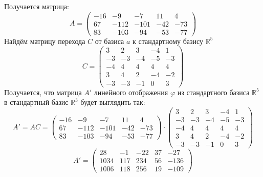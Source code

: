 \documentclass[a4paper]{article}
\newcommand{\mat}[1]{\begin{pmatrix} #1 \end{pmatrix}}
\renewcommand{\phi}{\varphi}
\newcommand{\RR}{\mathbb{R}}
\begin{document}
\begin{enumerate}
\begin{enumerate}
        Получается матрица:
        $$A = \begin{pmatrix}
            -16 & -9 & -7 & 11 & 4 \\
            67 & -112 & -101 & -42 & -73  \\
            83 & -103 & -94 & -53 & -77 
            \end{pmatrix}$$
        Найдём матрицу перехода $C$ от базиса $a$ к стандартному базису $\RR^5$
        $$C = \mat{3 & 2 & 3 & -4 & 1 \\
        -3 & -3 & -4 & -5 & -3 \\
        -4 & 4 & 4 & 4 & 4 \\
        3 & 4 & 2 & -4 & -2 \\
        -3 & -3 & -1 & 0 & 3}$$
        Получается, что матрица $A'$ линейного отображения $\phi$ из стандартного базиса $\RR^5$
        в стандартный базис $\RR^3$ будет выглядить так:
        $$A' = AC = \begin{pmatrix}
            -16 & -9 & -7 & 11 & 4 \\
            67 & -112 & -101 & -42 & -73  \\
            83 & -103 & -94 & -53 & -77 
            \end{pmatrix} \cdot \mat{3 & 2 & 3 & -4 & 1 \\
            -3 & -3 & -4 & -5 & -3 \\
            -4 & 4 & 4 & 4 & 4 \\
            3 & 4 & 2 & -4 & -2 \\
            -3 & -3 & -1 & 0 & 3}$$
            $$A' = \mat{28 & -1 & -22 & 37 & -27 \\
            1034 & 117 & 234 & 56 & -136 \\
            1006 & 118 & 256 & 19 & -109}$$


\end{enumerate}
\end{enumerate}
\end{document}
